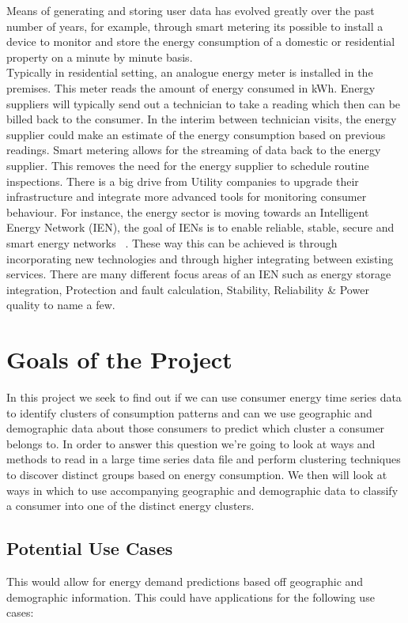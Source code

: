 Means of generating and storing user data has evolved greatly over the past number of years, for example, through smart metering its possible to install a device to monitor and store the energy consumption of a domestic or residential property on a minute by minute basis. \\
Typically in residential setting, an analogue energy meter is installed in the premises. This meter reads the amount of energy consumed in kWh. Energy suppliers will typically send out  a technician to take a reading which then can be billed back to the consumer. In the interim between technician visits, the energy supplier could make an estimate of the energy consumption based on previous readings. Smart metering allows for the streaming of data back to the energy supplier. This removes the need for the energy supplier to schedule routine inspections. There is a big drive from Utility companies to upgrade their infrastructure and integrate more advanced tools for monitoring consumer behaviour.
For instance, the energy sector is moving towards an Intelligent Energy Network (IEN), the goal of IENs is to enable reliable, stable, secure and smart energy networks ~\cite{IEN}. These way this can be achieved is through incorporating new technologies and through higher integrating between existing services. There are many different focus areas of an IEN such as energy storage integration, Protection and fault calculation, Stability, Reliability \& Power quality to name a few.

\section{Goals of the Project}
In this project we seek to find out if we can use consumer energy time series data to identify clusters of consumption patterns and can we use geographic and demographic data about those consumers to predict which cluster a consumer belongs to. In order to answer this question we're going to look at ways and methods to read in a large time series data file and perform clustering techniques to discover distinct groups based on energy consumption. We then will look at ways in which to use accompanying geographic and demographic data to classify a consumer into one of the distinct energy clusters.

\subsection{Potential Use Cases}
This would allow for energy demand predictions based off geographic and demographic information. This could have applications for the following use cases:

